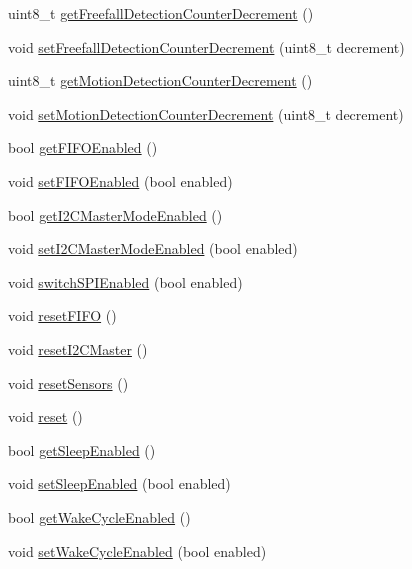 \begin{DoxyCompactItemize}
uint8\+\_\+t \mbox{\hyperlink{class_m_p_u6050_af6d6fa9869636989a8b29c4827ad7de8}{get\+Freefall\+Detection\+Counter\+Decrement}} ()
\item 
void \mbox{\hyperlink{class_m_p_u6050_a18dd79b7c53600e9ce97eed4bfe6cf15}{set\+Freefall\+Detection\+Counter\+Decrement}} (uint8\+\_\+t decrement)
\item 
uint8\+\_\+t \mbox{\hyperlink{class_m_p_u6050_a0ed8de8eb440dbfdec829297527b0da6}{get\+Motion\+Detection\+Counter\+Decrement}} ()
\item 
void \mbox{\hyperlink{class_m_p_u6050_a74cc3ea727afa5d4406175085e60d08c}{set\+Motion\+Detection\+Counter\+Decrement}} (uint8\+\_\+t decrement)
\item 
bool \mbox{\hyperlink{class_m_p_u6050_ae2687a09ebe0d7fbbf74f560e0dd9a44}{get\+F\+I\+F\+O\+Enabled}} ()
\item 
void \mbox{\hyperlink{class_m_p_u6050_a78e58ab27986db6999af775ed4d43091}{set\+F\+I\+F\+O\+Enabled}} (bool enabled)
\item 
bool \mbox{\hyperlink{class_m_p_u6050_a6b45e538f2082eb1b1975ed56e3e21bc}{get\+I2\+C\+Master\+Mode\+Enabled}} ()
\item 
void \mbox{\hyperlink{class_m_p_u6050_a6503f0fdfefa0fd287a75032667b7b69}{set\+I2\+C\+Master\+Mode\+Enabled}} (bool enabled)
\item 
void \mbox{\hyperlink{class_m_p_u6050_a269710b7bca814bbf67e7bb38c381650}{switch\+S\+P\+I\+Enabled}} (bool enabled)
\item 
void \mbox{\hyperlink{class_m_p_u6050_aafa0dc38b7ea2acd1aecd5d9df8cbd08}{reset\+F\+I\+FO}} ()
\item 
void \mbox{\hyperlink{class_m_p_u6050_a96332c394f1b7efd44c83a4ff690e732}{reset\+I2\+C\+Master}} ()
\item 
void \mbox{\hyperlink{class_m_p_u6050_a9a271104d3302abc4af005c69a930094}{reset\+Sensors}} ()
\item 
void \mbox{\hyperlink{class_m_p_u6050_a7100b6d276c3c8664cf00d768b7b0dee}{reset}} ()
\item 
bool \mbox{\hyperlink{class_m_p_u6050_a196404ef04b959083d4bf5e6f1cd8b98}{get\+Sleep\+Enabled}} ()
\item 
void \mbox{\hyperlink{class_m_p_u6050_a15ec5f8e7daf235f507c1d8b96af051a}{set\+Sleep\+Enabled}} (bool enabled)
\item 
bool \mbox{\hyperlink{class_m_p_u6050_a89afc5235b9088c696e2cc7841f5259a}{get\+Wake\+Cycle\+Enabled}} ()
\item 
void \mbox{\hyperlink{class_m_p_u6050_a340eade71cf6286f6904c2021330944e}{set\+Wake\+Cycle\+Enabled}} (bool enabled)

\end{DoxyCompactItemize}
